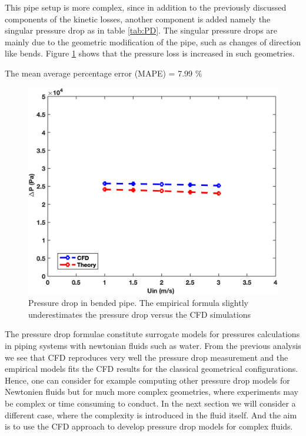 \documentclass[review,3p,times,12pt]{elsarticle}
\begin{document}
This pipe setup is more complex, since in addition to the previously discussed components of the  kinetic losses, another component is added namely the singular pressure drop as in table \ref{tab:PD}. The singular pressure drops are mainly due to the geometric modification of the pipe, such as changes of direction like bends. Figure \ref{bend:theo} shows that the pressure loss is increased in such geometries.
\begin{minipage}[t]{0.45\textwidth}
\vspace{3.5cm}
\small{The mean average percentage error (MAPE) = 7.99 $\%$}
\end{minipage} \hfill 
\begin{minipage}[t]{0.55\textwidth}
\begin{figure}[H]
\begin{center}
\includegraphics[scale = 0.45]{bend1}
\caption{ Pressure drop in bended pipe. The empirical formula slightly underestimates the pressure drop versus the CFD simulations }
\label{bend:theo}
 \end{center}
\end{figure}
\end{minipage}

The pressure drop formulae constitute surrogate models for pressures calculations in piping systems with newtonian fluids such as water. From the previous analysis we see that CFD reproduces very well the pressure drop measurement and the empirical models fits the CFD results for the classical geometrical configurations. Hence, one can consider for example computing other pressure drop models for Newtonien fluids but for much more complex geometries, where experiments may be complex or time consuming to conduct. In the next section we will consider a different case, where the complexity is introduced in the fluid itself. And the aim is to use the CFD approach to develop pressure drop models for complex fluids.
\end{document}
